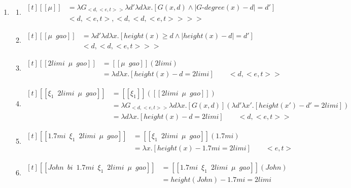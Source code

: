 \documentclass{ctexart}
\begin{document}
\begin{enumerate}
    \item \label{maomao17}
    \begin{enumerate}
        \item \label{maomao17_b}
        $\begin{aligned}[t]
            [\![\mu]\!] &= \lambda G_{<d,<e,t>>} \lambda d' \lambda d \lambda x.[G(x,d) \land | G \mbox{-} degree(x) - d | = d'] \\
            & <d,<e,t>,<d,<d,<e,t>>>>
        \end{aligned}$
        
        \item \label{maomao17_c}
        $\begin{aligned}[t]
            [\![\mu \enspace gao]\!] &= \lambda d' \lambda d \lambda x.[height(x) \geq d \land |height(x) - d|=d'] \\
            & <d,<d,<e,t>>>
        \end{aligned}$

        \item \label{maomao17_d}
        $\begin{aligned}[t]
            [\![2limi \enspace \mu \enspace gao]\!] &= [\![\mu \enspace gao]\!](2limi) \\
            &= \lambda d \lambda x. [height(x) - d = 2 limi] \qquad <d,<e,t>>
        \end{aligned}$

        \item \label{maomao17_e}
        $\begin{aligned}[t]
            [\![\xi_1 \enspace 2limi \enspace \mu \enspace gao]\!] &= [\![\xi_1]\!]([\![2limi \enspace \mu \enspace gao]\!]) \\
            &= \lambda G_{<d,<e,t>>} \lambda d \lambda x. [G(x,d)](\lambda d' \lambda x'. [height(x') - d' = 2 limi])\\
            &= \lambda d \lambda x. [height(x)-d=2limi] \qquad <d,<e,t>>
        \end{aligned}$

        \item \label{maomao17_f}
        $\begin{aligned}[t]
            [\![1.7mi \enspace \xi_1 \enspace 2limi \enspace \mu \enspace gao]\!] &= [\![\xi_1 \enspace 2limi \enspace \mu \enspace gao]\!](1.7mi) \\
            &=\lambda x.[height(x) -1.7mi=2limi] \qquad <e,t>
        \end{aligned}$

        \item \label{maomao17_g}
        $\begin{aligned}[t]
            [\![John \enspace bi \enspace 1.7mi \enspace \xi_1 \enspace 2limi \enspace \mu \enspace gao]\!] &= [\![1.7mi \enspace \xi_1 \enspace 2limi \enspace \mu \enspace gao]\!](John) \\
            &=height(John) -1.7mi=2limi
        \end{aligned}$

    \end{enumerate}
\end{enumerate}
\end{document}
